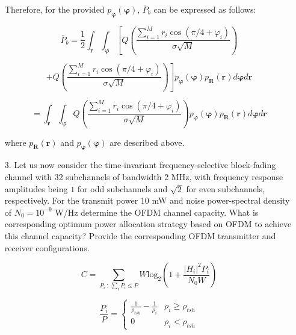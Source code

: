 \documentclass[fleqn]{article}
\begin{document}
\begin{enumerate}
		Therefore, for the provided $p_{\boldsymbol{\varphi}}(\boldsymbol{\varphi})$, $\bar{P}_b$ can be expressed as follows:
		
		\begin{equation*}
			\bar{P}_b = \frac{1}{2}\int_{\mathbf{r}}{\int_{\boldsymbol{\varphi}}{\left[Q\left(\frac{\sum_{i=1}^{M}{r_i\cos(\pi/4 + \varphi_i)}}{\sigma\sqrt{M}}\right)\right.}}
		\end{equation*}
		
		\begin{equation*}
			{{\left. + Q\left(\frac{\sum_{i=1}^{M}{r_i\cos(\pi/4 + \varphi_i)}}{\sigma\sqrt{M}}\right)\right]p_{\boldsymbol{\varphi}}(\boldsymbol{\varphi})p_{\mathbf{R}}(\mathbf{r})d\boldsymbol{\varphi}}d\mathbf{r}}
		\end{equation*}
		
		\begin{equation*}
			= \int_{\mathbf{r}}{\int_{\boldsymbol{\varphi}}{Q\left(\frac{\sum_{i=1}^{M}{r_i\cos(\pi/4 + \varphi_i)}}{\sigma\sqrt{M}}\right)p_{\boldsymbol{\varphi}}(\boldsymbol{\varphi})p_{\mathbf{R}}(\mathbf{r})d\boldsymbol{\varphi}}d\mathbf{r}}
		\end{equation*}
		
		where $p_\mathbf{R}(\mathbf{r})$ and $p_{\boldsymbol{\varphi}}(\boldsymbol{\varphi})$ are described above.
		 
		\item[3.] Let us now consider the time-invariant frequency-selective block-fading channel with 32 subchannels of bandwidth 2 MHz, with frequency response amplitudes being $1$ for odd subchannels and $\sqrt{2}$ for even subchannels, respectively. For the transmit power 10 mW and noise power-spectral density of $N_0=10^{-9}$ W/Hz determine the OFDM channel capacity. What is corresponding optimum power allocation strategy based on OFDM to achieve this channel capacity? Provide the corresponding OFDM transmitter and receiver configurations.
		
		\begin{equation*}
			C = \underset{P_i \ :\ \sum_i{P_i \leq P}}{\sum}{W\text{log}_2\left(1 + \frac{|H_i|^2P_i}{N_0W}\right)}
		\end{equation*}
		
		\begin{equation*}
			\frac{P_i}{P} = \begin{cases}
				\frac{1}{\rho_{tsh}} - \frac{1}{\rho_i} & \rho_i \geq \rho_{tsh} \\
				0 & \rho_i < \rho_{tsh}
			\end{cases}
		\end{equation*}
		

\end{enumerate}
\end{document}
